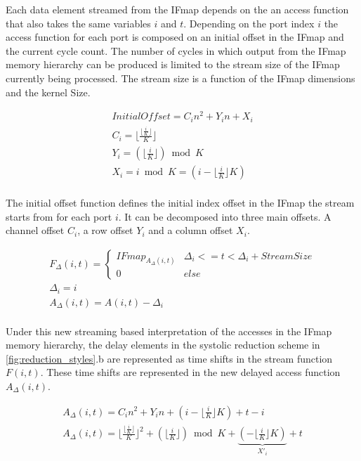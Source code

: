 Each data element streamed from the IFmap depends on the an access function that
also takes the same variables $i$ and $t$. Depending on the port index $i$ the
access function for each port is composed on an initial offset in the IFmap and
the current cycle count. The number of cycles in which output from the IFmap
memory hierarchy can be produced is limited to the stream size of the IFmap
currently being processed. The stream size is a function of the IFmap dimensions
and the kernel Size. 

\begin{gather}
    InitialOffset = C_in^2+Y_in+X_i \\
    C_i = \lfloor \frac{\lfloor \frac{i}{K} \rfloor}{K} \rfloor \\
    Y_i = (\lfloor \frac{i}{K} \rfloor ) \bmod K\\
    X_i = i \bmod K = (i - \lfloor \frac{i}{K} \rfloor K)\\
\end{gather}

The initial offset function defines the initial index
offset in the IFmap the stream starts from for each port $i$. It can be
decomposed into three main offsets. A channel offset $C_i$, a row offset $Y_i$
and a column offset $X_i$. 

\begin{gather}
    F_\Delta(i, t) = \begin{cases}
    IFmap_{A_\Delta(i, t)} & \Delta_i<=t < \Delta_i+ StreamSize \\
    0 & else
    \end{cases} \\
    \Delta_i = i \\
    A_\Delta(i,t) = A(i, t) - \Delta_i\\
\end{gather}

Under this new streaming based interpretation of the accesses in the IFmap
memory hierarchy, the delay elements in the systolic reduction scheme in
\autoref{fig:reduction_styles}.b are represented as time shifts in the stream
function $F(i,t)$. These time shifts are represented in the new delayed access
function $A_\Delta(i, t)$.

\begin{gather}
    A_\Delta(i,t) =  C_in^2+Y_in+(i - \lfloor \frac{i}{K} \rfloor K) + t- i\\
    A_\Delta(i,t) =  \lfloor \frac{\lfloor \frac{i}{K} \rfloor}{K} \rfloor^2+(\lfloor \frac{i}{K} \rfloor ) \bmod K + \underbrace{(- \lfloor \frac{i}{K} \rfloor K)}_{X'_i} + t\\
\end{gather}


